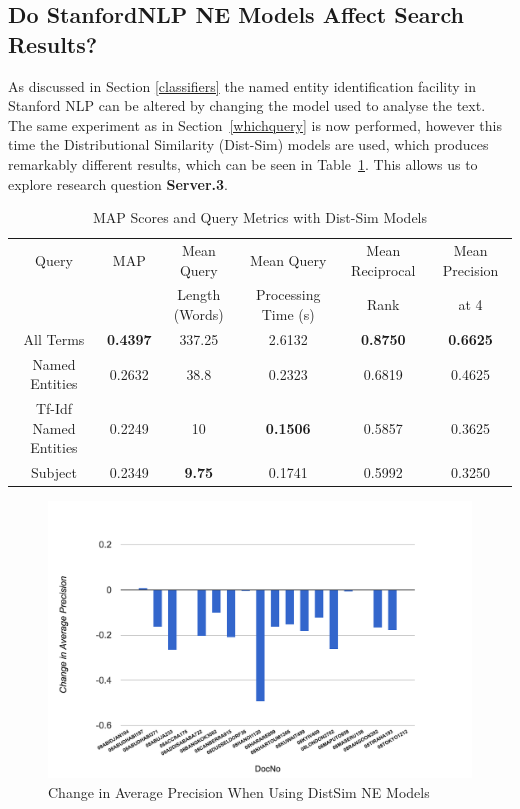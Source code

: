 \documentclass{l4proj}
\begin{document}
\subsection{Do StanfordNLP NE Models Affect Search Results?} \label{distsim}
As discussed in Section \ref{classifiers} the named entity identification facility in Stanford NLP can be altered by changing the model used to analyse the text. The same experiment as in Section~\ref{whichquery} is now performed, however this time the Distributional Similarity (Dist-Sim) models are used, which produces remarkably different results, which can be seen in Table~\ref{distsimresults}. This allows us to explore research question \textbf{Server.3}.
\begin{table}[H]
\centering
\begin{tabular}{|c|c|c|c|c|c|}
\hline
Query					& MAP    			& Mean Query		& Mean Query  			& Mean Reciprocal 		& Mean Precision	\\ 
						& 					& Length (Words) 	& Processing Time (s)	& Rank 					& at 4				\\ \hline
All Terms             	& \textbf{0.4397} 	& 337.25            & 2.6132  				& \textbf{0.8750} 		& \textbf{0.6625}   \\ \hline
Named Entities       	& 0.2632 			& 38.8             	& 0.2323    			& 0.6819 				& 0.4625           	\\ \hline
Tf-Idf Named Entities 	& 0.2249 			& 10                & \textbf{0.1506}   	& 0.5857 				& 0.3625        	\\ \hline
Subject               	& 0.2349 			& \textbf{9.75}     & 0.1741   				& 0.5992 				& 0.3250           	\\ \hline
\end{tabular}
\caption{MAP Scores and Query Metrics with Dist-Sim Models}
\label{distsimresults}
\end{table}
\begin{figure}[H]
\centering
\includegraphics[scale=0.85]{images/query_by_query_change}
\caption{Change in Average Precision When Using DistSim NE Models}
\label{query_by_query}
\end{figure}
\end{document}
